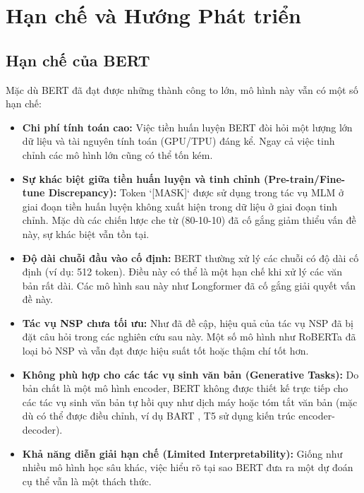\section{Hạn chế và Hướng Phát triển}
\label{sec:han_che_huong_phat_trien}

\subsection{Hạn chế của BERT}
\label{ssec:han_che_bert}
Mặc dù BERT đã đạt được những thành công to lớn, mô hình này vẫn có một số hạn chế:
\begin{itemize}
    \item \textbf{Chi phí tính toán cao:} Việc tiền huấn luyện BERT đòi hỏi một lượng lớn dữ liệu và tài nguyên tính toán (GPU/TPU) đáng kể. Ngay cả việc tinh chỉnh các mô hình lớn cũng có thể tốn kém.
    \item \textbf{Sự khác biệt giữa tiền huấn luyện và tinh chỉnh (Pre-train/Fine-tune Discrepancy):} Token `[MASK]` được sử dụng trong tác vụ MLM ở giai đoạn tiền huấn luyện không xuất hiện trong dữ liệu ở giai đoạn tinh chỉnh. Mặc dù các chiến lược che từ (80-10-10) đã cố gắng giảm thiểu vấn đề này, sự khác biệt vẫn tồn tại.
    \item \textbf{Độ dài chuỗi đầu vào cố định:} BERT thường xử lý các chuỗi có độ dài cố định (ví dụ: 512 token). Điều này có thể là một hạn chế khi xử lý các văn bản rất dài. Các mô hình sau này như Longformer \cite{beltagy2020longformer} đã cố gắng giải quyết vấn đề này.
    \item \textbf{Tác vụ NSP chưa tối ưu:} Như đã đề cập, hiệu quả của tác vụ NSP đã bị đặt câu hỏi trong các nghiên cứu sau này. Một số mô hình như RoBERTa \cite{liu2019roberta} đã loại bỏ NSP và vẫn đạt được hiệu suất tốt hoặc thậm chí tốt hơn.
    \item \textbf{Không phù hợp cho các tác vụ sinh văn bản (Generative Tasks):} Do bản chất là một mô hình encoder, BERT không được thiết kế trực tiếp cho các tác vụ sinh văn bản tự hồi quy như dịch máy hoặc tóm tắt văn bản (mặc dù có thể được điều chỉnh, ví dụ BART \cite{lewis2019bart}, T5 \cite{raffel2020exploring} sử dụng kiến trúc encoder-decoder).
    \item \textbf{Khả năng diễn giải hạn chế (Limited Interpretability):} Giống như nhiều mô hình học sâu khác, việc hiểu rõ tại sao BERT đưa ra một dự đoán cụ thể vẫn là một thách thức.
\end{itemize}

